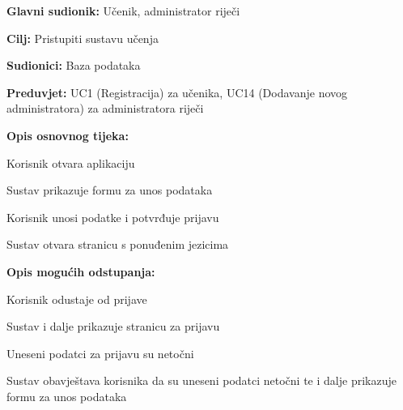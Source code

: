 					
					\noindent {}
					\begin{packed_item}
						
						\item \textbf{Glavni sudionik: }Učenik, administrator riječi
						\item  \textbf{Cilj:} Pristupiti sustavu učenja
						\item  \textbf{Sudionici:} Baza podataka
						\item  \textbf{Preduvjet:} UC1 (Registracija) za učenika, UC14 (Dodavanje novog administratora) za administratora riječi
						\item  \textbf{Opis osnovnog tijeka:}
						
						\item[] \begin{packed_enum}
							
							\item Korisnik otvara aplikaciju
							\item Sustav prikazuje formu za unos podataka
							\item Korisnik unosi podatke i potvrđuje prijavu
							\item Sustav otvara stranicu s ponuđenim jezicima
						\end{packed_enum}
						
						\item  \textbf{Opis mogućih odstupanja:}
						
						\item[] \begin{packed_item}
							
							\item[3.a] Korisnik odustaje od prijave
							\item[] \begin{packed_enum}
								
								\item Sustav i dalje prikazuje stranicu za prijavu
								
							\end{packed_enum}
							
							\item[3.b] Uneseni podatci za prijavu su netočni
							\item[] \begin{packed_enum}
								
								\item Sustav obavještava korisnika da su uneseni podatci netočni te i dalje prikazuje formu za unos podataka
								

\end{packed_enum}
\end{packed_item}
\end{packed_item}
